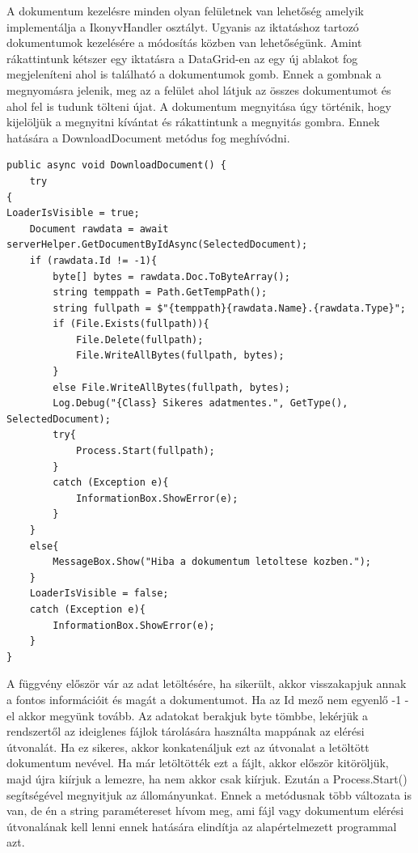 \documentclass[
]{thesis-ekf}
\theoremstyle{definition}
\theoremstyle{remark}
\begin{document}
A dokumentum kezelésre minden olyan felületnek van lehetőség amelyik implementálja a IkonyvHandler osztályt. Ugyanis az iktatáshoz tartozó dokumentumok kezelésére a módosítás közben van lehetőségünk. Amint rákattintunk kétszer egy iktatásra a DataGrid-en az egy új ablakot fog megjeleníteni ahol is található a dokumentumok gomb. Ennek a gombnak a megnyomásra jelenik, meg az a felület ahol látjuk az összes dokumentumot és ahol fel is tudunk tölteni újat. A dokumentum megnyitása úgy történik, hogy kijelöljük a megnyitni kívántat és rákattintunk a megnyitás gombra. Ennek hatására a DownloadDocument metódus fog meghívódni.
\begin{lstlisting}[showstringspaces=false,caption={Dokumentum letöltése.},captionpos=b]
public async void DownloadDocument() {
	try
{
LoaderIsVisible = true;
	Document rawdata = await serverHelper.GetDocumentByIdAsync(SelectedDocument);
	if (rawdata.Id != -1){
		byte[] bytes = rawdata.Doc.ToByteArray();
		string temppath = Path.GetTempPath();
		string fullpath = $"{temppath}{rawdata.Name}.{rawdata.Type}";
		if (File.Exists(fullpath)){
			File.Delete(fullpath);
			File.WriteAllBytes(fullpath, bytes);
		}
		else File.WriteAllBytes(fullpath, bytes);
		Log.Debug("{Class} Sikeres adatmentes.", GetType(), SelectedDocument);
		try{
			Process.Start(fullpath);
		}
		catch (Exception e){
			InformationBox.ShowError(e);
		}
	}
	else{
		MessageBox.Show("Hiba a dokumentum letoltese kozben.");
	}
	LoaderIsVisible = false;
	catch (Exception e){
		InformationBox.ShowError(e);
	}
}
\end{lstlisting}

A függvény először vár az adat letöltésére, ha sikerült, akkor visszakapjuk annak a fontos információit és magát a dokumentumot. Ha az Id mező nem egyenlő -1 -el akkor megyünk tovább. Az adatokat berakjuk byte tömbbe, lekérjük a rendszertől az ideiglenes fájlok tárolására használta mappának az elérési útvonalát. Ha ez sikeres, akkor konkatenáljuk ezt az útvonalat a letöltött dokumentum nevével. Ha már letöltötték ezt a fájlt, akkor először kitöröljük, majd újra kiírjuk a lemezre, ha nem akkor csak kiírjuk. Ezután a Process.Start() segítségével megnyitjuk az állományunkat. Ennek a metódusnak több változata is van, de én a string paramétereset hívom meg, ami fájl vagy dokumentum elérési útvonalának kell lenni ennek hatására elindítja az alapértelmezett programmal azt.
\end{document}
